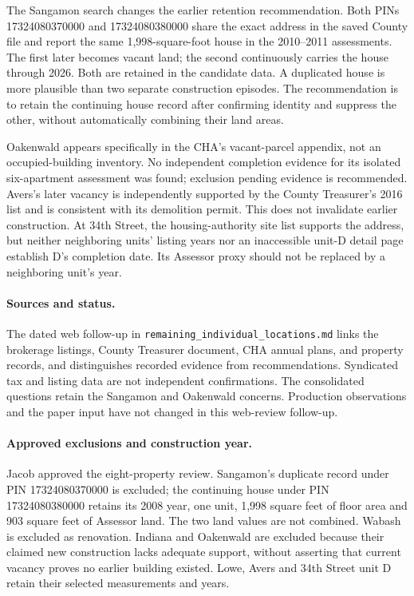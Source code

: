 The Sangamon search changes the earlier retention recommendation. Both PINs 17324080370000 and 17324080380000 share the exact address in the saved County file and report the same 1,998-square-foot house in the 2010--2011 assessments. The first later becomes vacant land; the second continuously carries the house through 2026. Both are retained in the candidate data. A duplicated house is more plausible than two separate construction episodes. The recommendation is to retain the continuing house record after confirming identity and suppress the other, without automatically combining their land areas.

Oakenwald appears specifically in the CHA's vacant-parcel appendix, not an occupied-building inventory. No independent completion evidence for its isolated six-apartment assessment was found; exclusion pending evidence is recommended. Avers's later vacancy is independently supported by the County Treasurer's 2016 list and is consistent with its demolition permit. This does not invalidate earlier construction. At 34th Street, the housing-authority site list supports the address, but neither neighboring units' listing years nor an inaccessible unit-D detail page establish D's completion date. Its Assessor proxy should not be replaced by a neighboring unit's year.

\paragraph{Sources and status.} The dated web follow-up in \texttt{remaining\_individual\_locations.md} links the brokerage listings, County Treasurer document, CHA annual plans, and property records, and distinguishes recorded evidence from recommendations. Syndicated tax and listing data are not independent confirmations. The consolidated questions retain the Sangamon and Oakenwald concerns. Production observations and the paper input have not changed in this web-review follow-up.


\clearpage
\paragraph{Approved exclusions and construction year.}
Jacob approved the eight-property review. Sangamon's duplicate record under PIN 17324080370000 is excluded; the continuing house under PIN 17324080380000 retains its 2008 year, one unit, 1,998 square feet of floor area and 903 square feet of Assessor land. The two land values are not combined. Wabash is excluded as renovation. Indiana and Oakenwald are excluded because their claimed new construction lacks adequate support, without asserting that current vacancy proves no earlier building existed. Lowe, Avers and 34th Street unit D retain their selected measurements and years.

